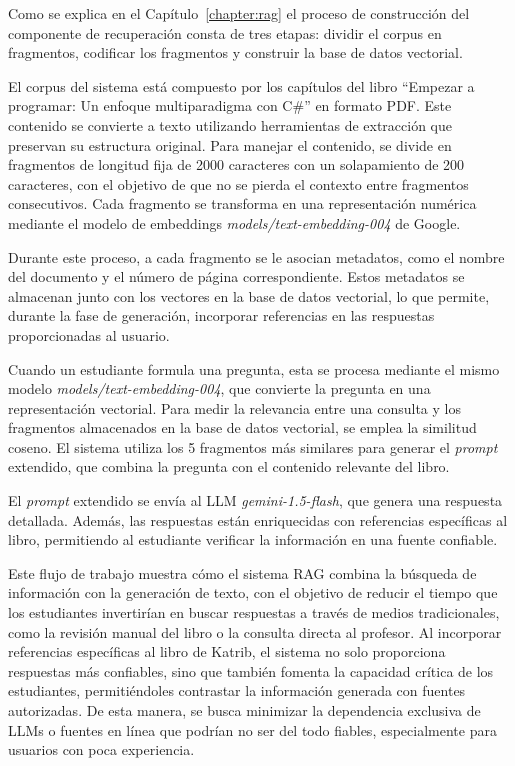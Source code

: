 Como se explica en el Capítulo~\ref{chapter:rag} el proceso de construcción del componente de recuperación consta de tres etapas: dividir el corpus en fragmentos, codificar los fragmentos y construir la base de datos vectorial.

El corpus del sistema está compuesto por los capítulos del libro ``Empezar a programar: Un enfoque multiparadigma con C\#'' en formato PDF. Este contenido se convierte a texto utilizando herramientas de extracción que preservan su estructura original. Para manejar el contenido, se divide en fragmentos de longitud fija de 2000 caracteres con un solapamiento de 200 caracteres, con el objetivo de que no se pierda el contexto entre fragmentos consecutivos. Cada fragmento se transforma en una representación numérica mediante el modelo de embeddings \textit{models/text-embedding-004} de Google.

Durante este proceso, a cada fragmento se le asocian metadatos, como el nombre del documento y el número de página correspondiente. Estos metadatos se almacenan junto con los vectores en la base de datos vectorial, lo que permite, durante la fase de generación, incorporar referencias en las respuestas proporcionadas al usuario.

Cuando un estudiante formula una pregunta, esta se procesa mediante el mismo modelo \textit{models/text-embedding-004}, que convierte la pregunta en una representación vectorial. Para medir la relevancia entre una consulta y los fragmentos almacenados en la base de datos vectorial, se emplea la similitud coseno. El sistema utiliza los 5 fragmentos más similares para generar el \textit{prompt} extendido, que combina la pregunta con el contenido relevante del libro.

El \textit{prompt} extendido se envía al LLM \textit{gemini-1.5-flash}, que genera una respuesta detallada. Además, las respuestas están enriquecidas con referencias específicas al libro, permitiendo al estudiante verificar la información en una fuente confiable.

Este flujo de trabajo muestra cómo el sistema RAG combina la búsqueda de información con la generación de texto, con el objetivo de reducir el tiempo que los estudiantes invertirían en buscar respuestas a través de medios tradicionales, como la revisión manual del libro o la consulta directa al profesor. Al incorporar referencias específicas al libro de Katrib, el sistema no solo proporciona respuestas más confiables, sino que también fomenta la capacidad crítica de los estudiantes, permitiéndoles contrastar la información generada con fuentes autorizadas. De esta manera, se busca minimizar la dependencia exclusiva de LLMs o fuentes en línea que podrían no ser del todo fiables, especialmente para usuarios con poca experiencia.

